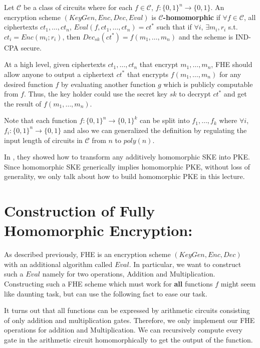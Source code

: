 \documentclass[usletter]{article}
\begin{document}
\begin{definition} Let $\mathcal{C}$ be a class of circuits where for each $f\in\mathcal{C}$, $f:\{0,1\}^n \rightarrow \{0,1\}$. An encryption scheme $(KeyGen, Enc, Dec, Eval)$ is \textbf{$\mathcal{C}$-homomorphic} if $\forall f\in \mathcal{C}$, all ciphertexts $ct_1, \dots, ct_n$, $Eval(f, ct_1,\dots,ct_n)=ct^*$ such that if  $\forall i$, $\exists m_i, r_i$ s.t. $ct_i=Enc(m_i;r_i)$, then $Dec_{sk}(ct^*)=f(m_1,\dots,m_n)$ and the scheme is IND-CPA secure.
\end{definition}
At a high level, given ciphertexts $ct_1,\dots,ct_n$ that encrypt $m_1,\dots,m_n$, FHE should allow anyone to output a ciphertext  $ct^*$ that encrypts $f(m_1,\dots,m_n)$ for any desired function $f$ by evaluating another function $g$ which is publicly computable from $f$. Thus, the key holder could use the secret key $sk$ to decrypt $ct^*$ and get the result of $f(m_1,\dots,m_n)$. 

Note that each function $f:\{0,1\}^n\rightarrow\{0,1\}^k$ can be split into $f_1,\dots,f_k$ where $\forall i$, $f_i:\{0,1\}^n\rightarrow\{0,1\}$ and also we can generalized the definition by regulating the input length of circuits in $\mathcal{C}$ from $n$ to $poly(n)$.

 In \cite{rothblum2011homomorphic}, they showed how to transform any additively homomorphic SKE into PKE. Since homomorphic SKE generically implies homomorphic PKE, without loss of generality, we only talk about how to build homomorphic PKE in this lecture.

\section{Construction of Fully Homomorphic Encryption:}
As described previously, FHE is an encryption scheme $(KeyGen, Enc, Dec)$ 
with an additional algorithm called $Eval$. In particular, we want to construct 
such a $Eval$ namely for two operations, Addition and Multiplication. Constructing 
such a FHE scheme which must work for \textbf{all} functions $f$ might seem like daunting task, 
but can use the following fact to ease our task.
\begin{fact}
It turns out that all functions can be expressed by arithmetic circuits consisting
of only addition and multiplication gates. Therefore, we only implement our FHE operations for 
addition and Multiplication. We can recursively compute every gate  in the arithmetic circuit 
homomorphically to get the output of the function. 
\end{fact}
\end{document}
